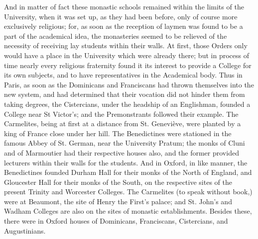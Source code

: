 And in matter of fact these
monastic schools remained within the limits of the University, when it
was set up, as they had been before, only of course more exclusively
religious; for, as soon as the reception of laymen was found to be a
part of the academical idea, the monasteries seemed to be relieved of
the necessity of receiving lay students within their walls. At first,
those Orders only would have a place in the University which were
already there; but in process of time nearly every religious
fraternity found it its interest to provide a College for its own subjects, and to have representatives in the Academical body. Thus
in Paris, as soon as the Dominicans and Franciscans had thrown
themselves into the new system, and had determined that their vocation
did not hinder them from taking degrees, the Cistercians, under the
headship of an Englishman, founded a College near St Victor's; and the
Premonstrants followed their example. The Carmelites, being at first
at a distance from St. Geneviève, were planted by a king of France
close under her hill. The Benedictines were stationed in the famous
Abbey of St. German, near the University Pratum; the monks of Cluni
and of Marmoutier had their respective houses also, and the former
provided lecturers within their walls for the students. And in Oxford,
in like manner, the Benedictines founded Durham Hall for their monks
of the North of England, and Gloucester Hall for their monks of the
South, on the respective sites of the present Trinity and Worcester
Colleges. The Carmelites (to speak without book,) were at Beaumont,
the site of Henry the First's palace; and St. John's and Wadham
Colleges are also on the sites of monastic establishments. Besides
these, there were in Oxford houses of Dominicans, Franciscans,
Cistercians, and Augustinians.

